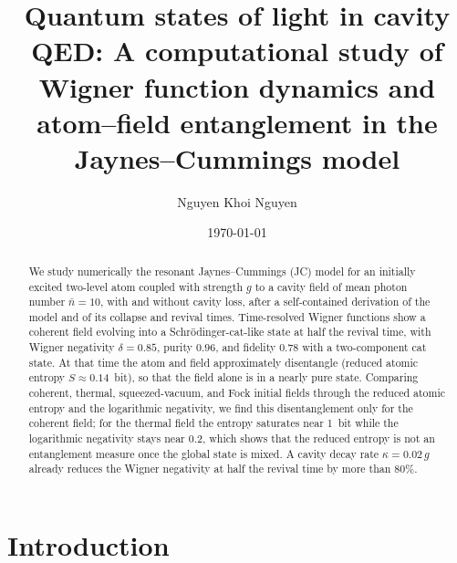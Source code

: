 \documentclass[%
 reprint,
 amsmath,amssymb,
 aps,
 floatfix,
]{revtex4-2}
\begin{document}
\title{Quantum states of light in cavity QED: A computational study of Wigner function dynamics and atom--field entanglement in the Jaynes--Cummings model}

\author{Nguyen Khoi Nguyen}

\date{\today}

\begin{abstract}
We study numerically the resonant Jaynes--Cummings (JC) model for an initially excited two-level atom coupled with strength $g$ to a cavity field of mean photon number $\bar{n} = 10$, with and without cavity loss, after a self-contained derivation of the model and of its collapse and revival times. Time-resolved Wigner functions show a coherent field evolving into a Schr\"{o}dinger-cat-like state at half the revival time, with Wigner negativity $\delta = 0.85$, purity $0.96$, and fidelity $0.78$ with a two-component cat state. At that time the atom and field approximately disentangle (reduced atomic entropy $S \approx 0.14$~bit), so that the field alone is in a nearly pure state. Comparing coherent, thermal, squeezed-vacuum, and Fock initial fields through the reduced atomic entropy and the logarithmic negativity, we find this disentanglement only for the coherent field; for the thermal field the entropy saturates near 1~bit while the logarithmic negativity stays near 0.2, which shows that the reduced entropy is not an entanglement measure once the global state is mixed. A cavity decay rate $\kappa = 0.02\,g$ already reduces the Wigner negativity at half the revival time by more than 80\%.
\end{abstract}


\maketitle

\section{Introduction}
\label{sec:intro}
\end{document}
